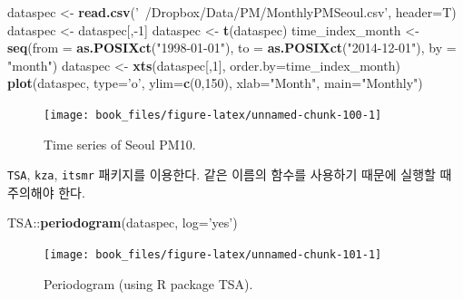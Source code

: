 \documentclass[b5paper,]{scrbook}
\makeatletter
\newenvironment{Shaded}{\begin{snugshade}}{\end{snugshade}}
\newcommand{\KeywordTok}[1]{\textcolor[rgb]{0.13,0.29,0.53}{\textbf{{#1}}}}
\newcommand{\DataTypeTok}[1]{\textcolor[rgb]{0.13,0.29,0.53}{{#1}}}
\newcommand{\DecValTok}[1]{\textcolor[rgb]{0.00,0.00,0.81}{{#1}}}
\newcommand{\StringTok}[1]{\textcolor[rgb]{0.31,0.60,0.02}{{#1}}}
\newcommand{\NormalTok}[1]{{#1}}
\theoremstyle{plain}
\theoremstyle{definition}
\numberwithin{equation}{section}
\newenvironment{kframe}{%
\medskip{}
\setlength{\fboxsep}{.8em}
 \def\at@end@of@kframe{}%
 \ifinner\ifhmode%
  \def\at@end@of@kframe{\end{minipage}}%
  \begin{minipage}{\columnwidth}%
 \fi\fi%
 \def\FrameCommand##1{\hskip\@totalleftmargin \hskip-\fboxsep
 \colorbox{shadecolor}{##1}\hskip-\fboxsep
     \hskip-\linewidth \hskip-\@totalleftmargin \hskip\columnwidth}%
 \MakeFramed {\advance\hsize-\width
   \@totalleftmargin\z@ \linewidth\hsize
   \@setminipage}}%
 {\par\unskip\endMakeFramed%
 \at@end@of@kframe}
\renewenvironment{Shaded}{\begin{kframe}}{\end{kframe}}
\makeatother
\begin{document}
\begin{Shaded}
\begin{Highlighting}[]
\NormalTok{dataspec <-}\StringTok{ }\KeywordTok{read.csv}\NormalTok{(}\StringTok{'~/Dropbox/Data/PM/MonthlyPMSeoul.csv'}\NormalTok{, }\DataTypeTok{header=}\NormalTok{T)}
\NormalTok{dataspec <-}\StringTok{ }\NormalTok{dataspec[,-}\DecValTok{1}\NormalTok{]}
\NormalTok{dataspec <-}\StringTok{ }\KeywordTok{t}\NormalTok{(dataspec)}
\NormalTok{time_index_month <-}\StringTok{ }\KeywordTok{seq}\NormalTok{(}\DataTypeTok{from =} \KeywordTok{as.POSIXct}\NormalTok{(}\StringTok{"1998-01-01"}\NormalTok{), }\DataTypeTok{to =} \KeywordTok{as.POSIXct}\NormalTok{(}\StringTok{"2014-12-01"}\NormalTok{), }\DataTypeTok{by =} \StringTok{"month"}\NormalTok{)}
\NormalTok{dataspec <-}\StringTok{ }\KeywordTok{xts}\NormalTok{(dataspec[,}\DecValTok{1}\NormalTok{], }\DataTypeTok{order.by=}\NormalTok{time_index_month)}
\KeywordTok{plot}\NormalTok{(dataspec, }\DataTypeTok{type=}\StringTok{'o'}\NormalTok{, }\DataTypeTok{ylim=}\KeywordTok{c}\NormalTok{(}\DecValTok{0}\NormalTok{,}\DecValTok{150}\NormalTok{), }\DataTypeTok{xlab=}\StringTok{"Month"}\NormalTok{, }\DataTypeTok{main=}\StringTok{"Monthly"}\NormalTok{)}
\end{Highlighting}
\end{Shaded}

\begin{figure}

{\centering \texttt{[image: book\_files/figure-latex/unnamed-chunk-100-1]} 

}

\caption{Time series of Seoul PM10.}\label{fig:unnamed-chunk-100}
\end{figure}

\texttt{TSA}, \texttt{kza}, \texttt{itsmr} 패키지를 이용한다. 같은
이름의 함수를 사용하기 때문에 실행할 때 주의해야 한다.

\begin{Shaded}
\begin{Highlighting}[]
\NormalTok{TSA::}\KeywordTok{periodogram}\NormalTok{(dataspec, }\DataTypeTok{log=}\StringTok{'yes'}\NormalTok{)}
\end{Highlighting}
\end{Shaded}

\begin{figure}

{\centering \texttt{[image: book\_files/figure-latex/unnamed-chunk-101-1]} 

}

\caption{Periodogram (using R package TSA).}\label{fig:unnamed-chunk-101}
\end{figure}
\end{document}
